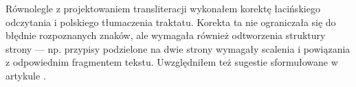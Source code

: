\documentclass[dvipsnames,12pt]{article}
\begin{document}
Równolegle z projektowaniem transliteracji wykonałem korektę
łacińskiego odczytania i polskiego tłumaczenia traktatu. Korekta ta
nie ograniczała się do błędnie rozpoznanych znaków, ale wymagała
również odtworzenia struktury strony --- np. przypisy podzielone na
dwie strony wymagały scalenia i powiązania z odpowiednim fragmentem
tekstu. Uwzględniłem też
sugestie sformułowane w
artykule \parencite{rafał08:_jakub_parkos_polis_mnemon_verse}.



\raggedright

\newpage
 
 \newpage
 
 \newpage
 
 
\newpage

\newpage

\newpage
 
\newpage
 
\newpage
 
\newpage
 
\newpage
 
\newpage
 
\newpage
 
\newpage
 

\newpage
\printbibliography
\end{document}
